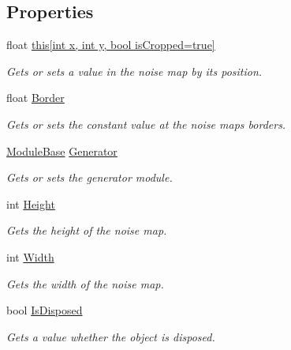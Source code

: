 \subsection*{Properties}
\begin{DoxyCompactItemize}
\item 
float \hyperlink{class_lib_noise_1_1_noise2_d_acfe5bd8d42d32d8250d5cbe021560195}{this\mbox{[}int x, int y, bool is\+Cropped=true\mbox{]}}
\begin{DoxyCompactList}\small\item\em Gets or sets a value in the noise map by its position. \end{DoxyCompactList}\item 
float \hyperlink{class_lib_noise_1_1_noise2_d_a2fe599fb07d0f17706cbd26b246660e3}{Border}
\begin{DoxyCompactList}\small\item\em Gets or sets the constant value at the noise maps borders. \end{DoxyCompactList}\item 
\hyperlink{class_lib_noise_1_1_module_base}{Module\+Base} \hyperlink{class_lib_noise_1_1_noise2_d_a02c039a4f7a9e13d7a848ed5bf83dbcd}{Generator}
\begin{DoxyCompactList}\small\item\em Gets or sets the generator module. \end{DoxyCompactList}\item 
int \hyperlink{class_lib_noise_1_1_noise2_d_adebca9dc1a1ab05075a8511fae245f27}{Height}
\begin{DoxyCompactList}\small\item\em Gets the height of the noise map. \end{DoxyCompactList}\item 
int \hyperlink{class_lib_noise_1_1_noise2_d_ad99d9aacdcab01adc90804b1182797f8}{Width}
\begin{DoxyCompactList}\small\item\em Gets the width of the noise map. \end{DoxyCompactList}\item 
bool \hyperlink{class_lib_noise_1_1_noise2_d_a30b537eb2a314410c25952d1b18f678c}{Is\+Disposed}
\begin{DoxyCompactList}\small\item\em Gets a value whether the object is disposed. \end{DoxyCompactList}\end{DoxyCompactItemize}
